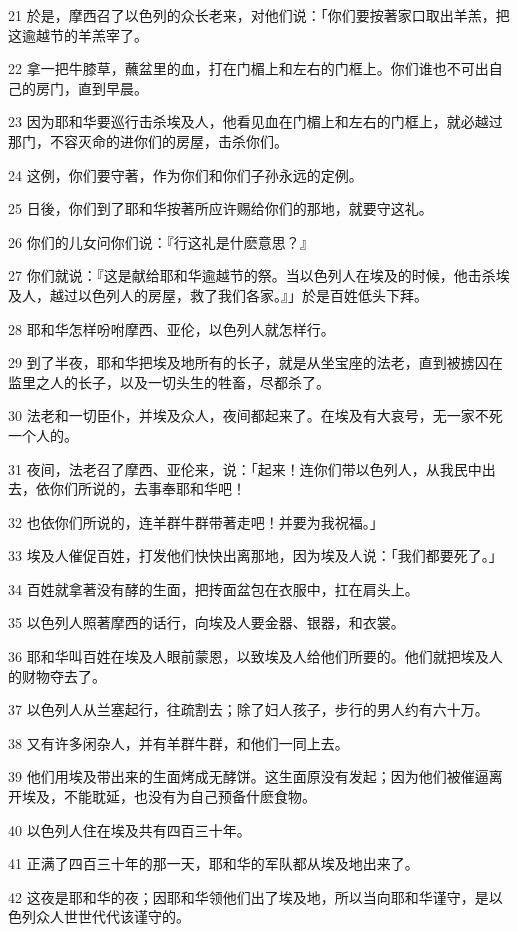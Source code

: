 \par 21 於是，摩西召了以色列的众长老来，对他们说：「你们要按著家口取出羊羔，把这逾越节的羊羔宰了。
\par 22 拿一把牛膝草，蘸盆里的血，打在门楣上和左右的门框上。你们谁也不可出自己的房门，直到早晨。
\par 23 因为耶和华要巡行击杀埃及人，他看见血在门楣上和左右的门框上，就必越过那门，不容灭命的进你们的房屋，击杀你们。
\par 24 这例，你们要守著，作为你们和你们子孙永远的定例。
\par 25 日後，你们到了耶和华按著所应许赐给你们的那地，就要守这礼。
\par 26 你们的儿女问你们说：『行这礼是什麽意思？』
\par 27 你们就说：『这是献给耶和华逾越节的祭。当以色列人在埃及的时候，他击杀埃及人，越过以色列人的房屋，救了我们各家。』」於是百姓低头下拜。
\par 28 耶和华怎样吩咐摩西、亚伦，以色列人就怎样行。
\par 29 到了半夜，耶和华把埃及地所有的长子，就是从坐宝座的法老，直到被掳囚在监里之人的长子，以及一切头生的牲畜，尽都杀了。
\par 30 法老和一切臣仆，并埃及众人，夜间都起来了。在埃及有大哀号，无一家不死一个人的。
\par 31 夜间，法老召了摩西、亚伦来，说：「起来！连你们带以色列人，从我民中出去，依你们所说的，去事奉耶和华吧！
\par 32 也依你们所说的，连羊群牛群带著走吧！并要为我祝福。」
\par 33 埃及人催促百姓，打发他们快快出离那地，因为埃及人说：「我们都要死了。」
\par 34 百姓就拿著没有酵的生面，把抟面盆包在衣服中，扛在肩头上。
\par 35 以色列人照著摩西的话行，向埃及人要金器、银器，和衣裳。
\par 36 耶和华叫百姓在埃及人眼前蒙恩，以致埃及人给他们所要的。他们就把埃及人的财物夺去了。
\par 37 以色列人从兰塞起行，往疏割去；除了妇人孩子，步行的男人约有六十万。
\par 38 又有许多闲杂人，并有羊群牛群，和他们一同上去。
\par 39 他们用埃及带出来的生面烤成无酵饼。这生面原没有发起；因为他们被催逼离开埃及，不能耽延，也没有为自己预备什麽食物。
\par 40 以色列人住在埃及共有四百三十年。
\par 41 正满了四百三十年的那一天，耶和华的军队都从埃及地出来了。
\par 42 这夜是耶和华的夜；因耶和华领他们出了埃及地，所以当向耶和华谨守，是以色列众人世世代代该谨守的。
